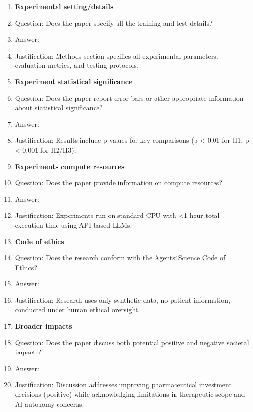 \documentclass{article}
\begin{document}
\begin{enumerate}
\item {\bf Experimental setting/details}
    \item[] Question: Does the paper specify all the training and test details?
    \item[] Answer: \answerYes{}
    \item[] Justification: Methods section specifies all experimental parameters, evaluation metrics, and testing protocols.

\item {\bf Experiment statistical significance}
    \item[] Question: Does the paper report error bars or other appropriate information about statistical significance?
    \item[] Answer: \answerYes{}
    \item[] Justification: Results include p-values for key comparisons (p < 0.01 for H1, p < 0.001 for H2/H3).

\item {\bf Experiments compute resources}
    \item[] Question: Does the paper provide information on compute resources?
    \item[] Answer: \answerYes{}
    \item[] Justification: Experiments run on standard CPU with <1 hour total execution time using API-based LLMs.

\item {\bf Code of ethics}
    \item[] Question: Does the research conform with the Agents4Science Code of Ethics?
    \item[] Answer: \answerYes{}
    \item[] Justification: Research uses only synthetic data, no patient information, conducted under human ethical oversight.

\item {\bf Broader impacts}
    \item[] Question: Does the paper discuss both potential positive and negative societal impacts?
    \item[] Answer: \answerYes{}
    \item[] Justification: Discussion addresses improving pharmaceutical investment decisions (positive) while acknowledging limitations in therapeutic scope and AI autonomy concerns.

\end{enumerate}
\end{document}
